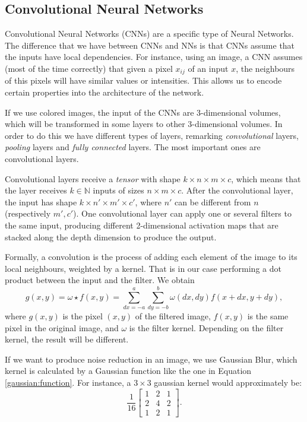 \subsection{Convolutional Neural Networks}

Convolutional Neural Networks (CNNs) are a specific type of Neural Networks. The difference that we have between CNNs and NNs is that CNNs assume that the inputs have local dependencies. For instance, using an image, a CNN assumes (most of the time correctly) that given a pixel $x_{ij}$ of an input $x$, the neighbours of this pixels will have similar values or intensities. This allows us to encode certain properties into the architecture of the network.

If we use colored images, the input of the CNNs are 3-dimensional volumes, which will be transformed in some layers to other 3-dimensional volumes. In order to do this we have different types of layers, remarking \emph{convolutional} layers, \emph{pooling} layers and \emph{fully connected} layers. The most important ones are convolutional layers.

Convolutional layers receive a \emph{tensor} with shape $k \times n \times m \times c$, which means that the layer receives $k \in \mathbb N$ inputs of sizes $n \times m \times c$.  After the convolutional layer, the input has shape $k \times n' \times m' \times c'$, where $n'$ can be different from $n$ (respectively $m',c'$). One convolutional layer can apply one or several filters to the same input, producing different 2-dimensional activation maps that are stacked along the depth dimension to produce the output.

Formally, a convolution is the process of adding each element of the image to its local neighbours, weighted by a kernel. That is in our case performing a dot product between the input and the filter. We obtain
\[
g(x,y) = \omega \star f(x,y) = \sum_{dx = -a}^a \sum_{dy = -b}^b \omega(dx,dy)f(x+dx,y+dy),    
\]
where $g(x,y)$ is the pixel $(x,y)$ of the filtered image, $f(x,y)$ is the same pixel in the original image, and $\omega$ is the filter kernel. Depending on the filter kernel, the result will be different. 
\begin{nexample}
If we want to produce noise reduction in an image, we use Gaussian Blur, which kernel is calculated by a Gaussian function like the one in Equation \ref{gaussian:function}. For instance, a $3\times 3 $ gaussian kernel would approximately be:
\[
\frac{1}{16}\begin{bmatrix}
    1 & 2 & 1\\
    2 & 4 & 2\\
    1 & 2 & 1
\end{bmatrix}.
\]
\end{nexample}

